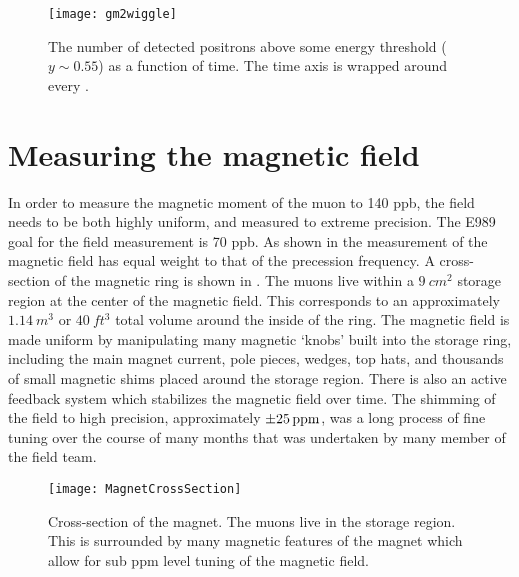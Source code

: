 \begin{figure}[]
    \centering
    \texttt{[image: gm2wiggle]}
    \caption[\gmtwo wiggle example]{The number of detected positrons above some energy threshold ($y \sim 0.55$) as a function of time. The time axis is wrapped around every .}
    \label{fig:gm2wiggle}
\end{figure}



\section{Measuring the magnetic field}
\label{sec:MagneticField}


In order to measure the magnetic moment of the muon to 140 ppb, the field needs to be both highly uniform, and measured to extreme precision. The E989 goal for the field measurement is 70 ppb. As shown in  the measurement of the magnetic field has equal weight to that of the precession frequency. A cross-section of the magnetic ring is shown in . The muons live within a $\SI{9}{cm^{2}}$ storage region at the center of the magnetic field. This corresponds to an approximately $\SI{1.14}{m^{3}}$ or $\SI{40}{ft^{3}}$ total volume around the inside of the ring. The magnetic field is made uniform by manipulating many magnetic `knobs' built into the \gmtwo storage ring, including the main magnet current, pole pieces, wedges, top hats, and thousands of small magnetic shims placed around the storage region. There is also an active feedback system which stabilizes the magnetic field over time. The shimming of the field to high precision, approximately $\SI{\pm 25}{ppm}$, was a long process of fine tuning over the course of many months that was undertaken by many member of the field team.

\begin{figure}[]
    \centering
    \texttt{[image: MagnetCrossSection]}
    \caption[Magnet cross section]{Cross-section of the \gmtwo magnet. The muons live in the storage region. This is surrounded by many magnetic features of the magnet which allow for sub ppm level tuning of the magnetic field.}
    \label{fig:MagnetCrossSection}
\end{figure}


